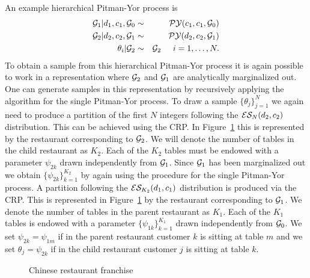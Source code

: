 An example hierarchical Pitman-Yor process is 
%
\begin{eqnarray*}
\G_1|d_1, c_1, \G_0 &\sim& \PY(c_1,c_1,\G_0)\\
\G_2 | d_2, c_2, \G_1 &\sim& \PY(d_2,c_2, \G_1)\\
\theta_i | \G_2 &\sim& \G_2 \hspace{.5cm} i = 1,\dots, N.
\end{eqnarray*}
%
To obtain a sample from this hierarchical Pitman-Yor process it is again possible to work in a representation where $\G_2$ and $\G_1$ are analytically marginalized out. One can generate samples in this representation by recursively applying the algorithm for the single Pitman-Yor process.  To draw a sample $\{ \theta_j \}_{j = 1}^N$ we again need to produce a partition of the first $N$ integers following the $\ES_N(d_2,c_2)$ distribution.  This can be achieved using the CRP.  In Figure~\ref{figHPY} this is represented by the restaurant corresponding to $\G_2$. We will denote the number of tables in the child restaurant as $K_2$.  Each of the $K_2$ tables must be endowed with a parameter $ \psi_{2k}$ drawn independently from $\G_1$.  Since $\G_1$ has been marginalized out we obtain $\{ \psi_{2k} \}_ {k = 1}^{K_2}$ by again using the procedure for the single Pitman-Yor process.  A partition following the $\ES_{K_2}(d_1,c_1)$ distribution is produced via the CRP.  This is represented in Figure~\ref{figHPY} by the restaurant corresponding to $\G_1$. We denote the number of tables in the parent restaurant as $K_1$.   Each of the $K_1$ tables is endowed with a parameter $\{ \psi_{1k} \}_{ k = 1}^{K_1}$ drawn independently from $\G_0$.  We set $\psi_{2k}  = \psi_{1m}$ if in the parent restaurant customer $k$ is sitting at table $m$ and we set $\theta_j = \psi_{2k}$ if in the child restaurant customer $j$ is sitting at table $k$.
%
\begin{figure}[t] 
	\begin{center}
		\caption{Chinese restaurant franchise}
		\label{figHPY}
	\end{center} 
\end{figure} 
